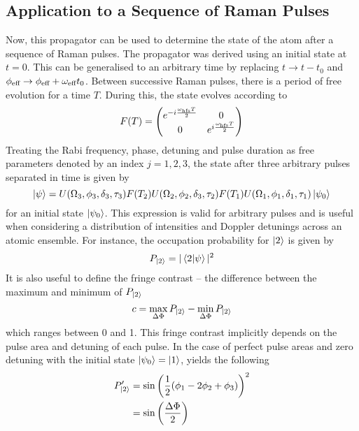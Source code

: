 \subsection{Application to a Sequence of Raman Pulses}
Now, this propagator can be used to determine the state of the atom
after a sequence of Raman pulses. The propagator was derived using an
initial state at $t=0$. This can be generalised to an arbitrary time
by replacing $t\rightarrow t-t_0$ and $\phi_\textnormal{eff} \rightarrow \phi_\textnormal{eff} +
\omega_\textnormal{eff} t_0$. Between successive Raman pulses, there is a period of
free evolution for a time $T$. During this, the state evolves
according to
\begin{equation}
  \label{eq:free_evolution}
  F(T) = \begin{pmatrix} e^{-i \frac{\omega_\textnormal{hfs} T}{2}} &0 \\
  0 & e^{i \frac{\omega_\textnormal{hfs} T}{2}}\end{pmatrix}
\end{equation}
Treating the Rabi frequency, phase, detuning and pulse duration as free
parameters denoted by an index $j=1,2,3$, the state after three arbitrary pulses separated in time
is given by
\begin{equation}
  \label{eq:general_state}
  \ket{\psi} = U(\Omega_3,\phi_3,\delta_3,\tau_3) F(T_2)
  U(\Omega_2,\phi_2,\delta_3,\tau_2) F(T_1)
  U(\Omega_1,\phi_1,\delta_1,\tau_1)
  \ket{\psi_0}
\end{equation}
for an initial state $\ket{\psi_0}$. This expression is valid for
arbitrary pulses and is useful when considering a
distribution of intensities and Doppler detunings across an atomic
ensemble. For instance, the occupation probability for $\ket{2}$ is
given by 
\begin{equation}
  \label{eq:occ_prob}
  P_{\ket{2}} = |\braket{2|\psi}|^2
\end{equation}
It is also useful to define the fringe contrast -- the difference
between the maximum and minimum of $P_{\ket{2}}$
\begin{equation}
  \label{eq:fringe_contrast}
  c = \max_{\Delta \Phi} P_{\ket{2}} -  \min_{\Delta \Phi} P_{\ket{2}} 
\end{equation}
which ranges between 0 and 1. This fringe contrast implicitly depends
on the pulse area and detuning of each pulse. In the case of perfect pulse areas and zero
detuning with the initial state $\ket{\psi_0} =
\ket{1}$,  yields the following
\begin{align}
  \label{eq:state_simp}
  P'_{\ket{2}} &= \sin \left(\frac{1}{2} (\phi_1-2
  \phi_2+\phi_3)\right)^2 \nonumber \\
  &= \sin\left(\frac{\Delta \Phi}{2}\right)
\end{align}
